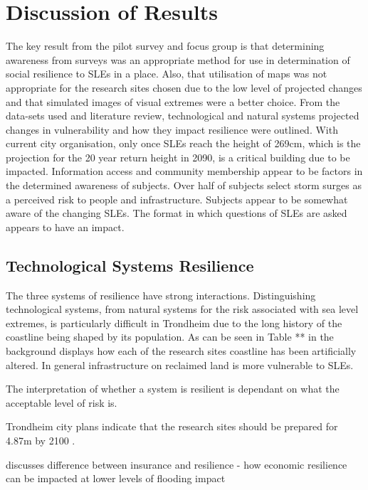 

\chapter{Discussion of Results}

The key result from the pilot survey and focus group is that determining awareness from surveys was an appropriate method for use in determination of social resilience to SLEs in a place. Also, that utilisation of maps was not appropriate for the research sites chosen due to the low level of projected changes and that simulated images of visual extremes were a better choice. From the data-sets used and literature review, technological and natural systems projected changes in vulnerability and how they impact resilience were outlined. With current city organisation, only once SLEs reach the height of 269cm, which is the projection for the 20 year return height in 2090, is a critical building due to be impacted. Information access and community membership appear to be factors in the determined awareness of subjects. Over half of subjects select storm surges as a perceived risk to people and infrastructure. Subjects appear to be somewhat aware of the changing SLEs. The format in which questions of SLEs are asked appears to have an impact. 

\section{Technological Systems Resilience}
The three systems of resilience have strong interactions. Distinguishing technological systems, from natural systems for the risk associated with sea level extremes, is particularly difficult in Trondheim due to the long history of the coastline being shaped by its population. As can be seen in Table ** in the background  displays how each of the research sites coastline has been artificially altered. In general infrastructure on reclaimed land is more vulnerable to SLEs.



The interpretation of whether a system is resilient is dependant on what the acceptable level of risk is.

Trondheim city plans indicate that the research sites should be prepared for 4.87m by 2100 \cite{hanssen_saksframlegg_2013}.

\cite{cutter_community_2020} discusses difference between insurance and resilience - how economic resilience can be impacted at lower levels of flooding impact

